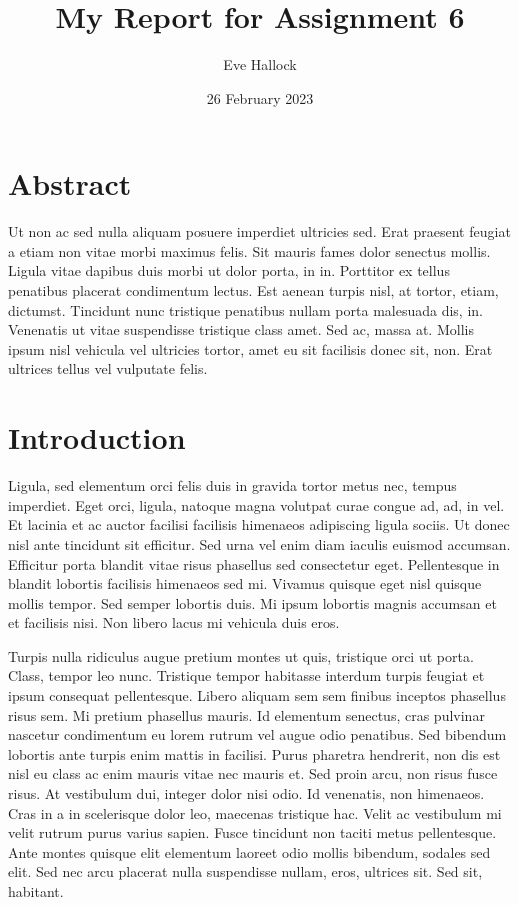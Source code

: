 \documentclass[11pt,]{report}
\title{My Report for Assignment 6}
\author{Eve Hallock}
\date{26 February 2023}
\begin{document}
\maketitle

{
\setcounter{tocdepth}{3}
\tableofcontents
}
\pagestyle{fancy}
\fancyfoot[C]{\thepage}

\hypertarget{abstract}{%
\chapter{Abstract}\label{abstract}}

Ut non ac sed nulla aliquam posuere imperdiet ultricies sed. Erat
praesent feugiat a etiam non vitae morbi maximus felis. Sit mauris fames
dolor senectus mollis. Ligula vitae dapibus duis morbi ut dolor porta,
in in. Porttitor ex tellus penatibus placerat condimentum lectus. Est
aenean turpis nisl, at tortor, etiam, dictumst. Tincidunt nunc tristique
penatibus nullam porta malesuada dis, in. Venenatis ut vitae suspendisse
tristique class amet. Sed ac, massa at. Mollis ipsum nisl vehicula vel
ultricies tortor, amet eu sit facilisis donec sit, non. Erat ultrices
tellus vel vulputate felis.

\hypertarget{introduction}{%
\chapter{Introduction}\label{introduction}}

Ligula, sed elementum orci felis duis in gravida tortor metus nec,
tempus imperdiet. Eget orci, ligula, natoque magna volutpat curae congue
ad, ad, in vel. Et lacinia et ac auctor facilisi facilisis himenaeos
adipiscing ligula sociis. Ut donec nisl ante tincidunt sit efficitur.
Sed urna vel enim diam iaculis euismod accumsan. Efficitur porta blandit
vitae risus phasellus sed consectetur eget. Pellentesque in blandit
lobortis facilisis himenaeos sed mi. Vivamus quisque eget nisl quisque
mollis tempor. Sed semper lobortis duis. Mi ipsum lobortis magnis
accumsan et et facilisis nisi. Non libero lacus mi vehicula duis eros.

Turpis nulla ridiculus augue pretium montes ut quis, tristique orci ut
porta. Class, tempor leo nunc. Tristique tempor habitasse interdum
turpis feugiat et ipsum consequat pellentesque. Libero aliquam sem sem
finibus inceptos phasellus risus sem. Mi pretium phasellus mauris. Id
elementum senectus, cras pulvinar nascetur condimentum eu lorem rutrum
vel augue odio penatibus. Sed bibendum lobortis ante turpis enim mattis
in facilisi. Purus pharetra hendrerit, non dis est nisl eu class ac enim
mauris vitae nec mauris et. Sed proin arcu, non risus fusce risus. At
vestibulum dui, integer dolor nisi odio. Id venenatis, non himenaeos.
Cras in a in scelerisque dolor leo, maecenas tristique hac. Velit ac
vestibulum mi velit rutrum purus varius sapien. Fusce tincidunt non
taciti metus pellentesque. Ante montes quisque elit elementum laoreet
odio mollis bibendum, sodales sed elit. Sed nec arcu placerat nulla
suspendisse nullam, eros, ultrices sit. Sed sit, habitant.
\end{document}

